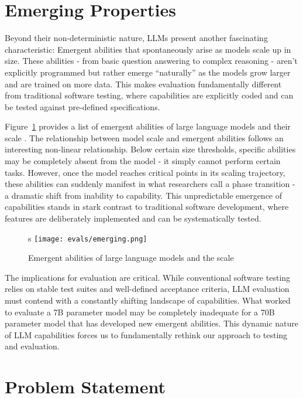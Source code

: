 \section{Emerging Properties}

Beyond their non-deterministic nature, LLMs present another fascinating characteristic: Emergent abilities that spontaneously arise as models scale up in size. These abilities - from basic question answering to complex reasoning - aren't explicitly programmed but rather emerge ``naturally'' as the models grow larger and are trained on more data. This makes evaluation fundamentally different from traditional software testing, where capabilities are explicitly coded and can be tested against pre-defined specifications.

Figure~\ref{fig:emerging-properties} provides a list of emergent abilities of large language models and their scale . The relationship between model scale and emergent abilities follows an interesting non-linear relationship. Below certain size thresholds, specific abilities may be completely absent from the model - it simply cannot perform certain tasks. However, once the model reaches critical points in its scaling trajectory, these abilities can suddenly manifest in what researchers call a phase transition - a dramatic shift from inability to capability. This unpredictable emergence of capabilities stands in stark contrast to traditional software development, where features are deliberately implemented and can be systematically tested.

\begin{figure}s
\centering
\texttt{[image: evals/emerging.png]}
\caption{Emergent abilities of large language models and the scale \cite{wei2022emergentabilitieslargelanguage}}
\label{fig:emerging-properties}
\end{figure}

The implications for evaluation are critical. While conventional software testing relies on stable test suites and well-defined acceptance criteria, LLM evaluation must contend with a constantly shifting landscape of capabilities. What worked to evaluate a 7B parameter model may be completely inadequate for a 70B parameter model that has developed new emergent abilities. This dynamic nature of LLM capabilities forces us to fundamentally rethink our approach to testing and evaluation.

\section{Problem Statement}

